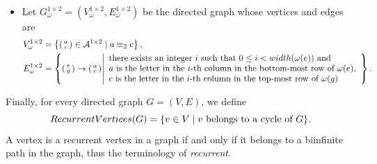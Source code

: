 \documentclass[12pt]{amsart}
\newcommand{\Acal}{\mathcal{A}} %
\newcommand{\height}{\textsc{height}}
\newcommand{\width}{\textsc{width}}
\newcommand{\RecurrentVertices}{\textsc{RecurrentVertices}}
\begin{document}
\begin{itemize}
\begin{align*}
\begin{smallmatrix}
            e&f
        \end{smallmatrix}\right)
        \to
        \left(\begin{smallmatrix}
            a&b
        \end{smallmatrix}\right)
        \middle|
        \begin{array}{l}
        \text{there exists an integer $j$ such that $0\leq j < \height(\omega(e))$ and}\\
        a \text{ is the letter in the $j$-th row in the right-most column of } \omega(e),\\
        b \text{ is the letter in the $j$-th row in the left-most column of } \omega(f)\\
        \end{array}
        \right\}.
\end{align*}
    \item
Let $G_\omega^{1\times2}=(V_\omega^{1\times2},E_\omega^{1\times2})$ be the
directed graph whose vertices and edges are 
\begin{align*}
    V_\omega^{1\times2} &= \left\{
        \left(\begin{smallmatrix}
            a\\
            c
        \end{smallmatrix}\right)
        \in\Acal^{1\times2}
        \mid
        a\equiv_2 c
        \right\},\\
    E_\omega^{1\times2} &= \left\{
        \left(\begin{smallmatrix}
            e\\
            g
        \end{smallmatrix}\right)
        \to
        \left(\begin{smallmatrix}
            a\\
            c
        \end{smallmatrix}\right)
        \middle|
        \begin{array}{l}
        \text{there exists an integer $i$ such that $0\leq i < \width(\omega(e))$ and}\\
        a \text{ is the letter in the $i$-th column in the bottom-most row of } \omega(e),\\
        c \text{ is the letter in the $i$-th column in the top-most row of } \omega(g)\\
        \end{array}
        \right\}.
\end{align*}
\end{itemize}
    Finally, for every directed graph $G=(V,E)$, we define
    \[
        \RecurrentVertices(G)
            =
            \{v\in V
            \mid
            v \text{ belongs to a cycle of }G\}.
    \]
    A vertex is a recurrent vertex in a graph if and only
    if it belongs to a biinfinite path in the graph,
    thus the terminology of \emph{recurrent}.
\end{document}
